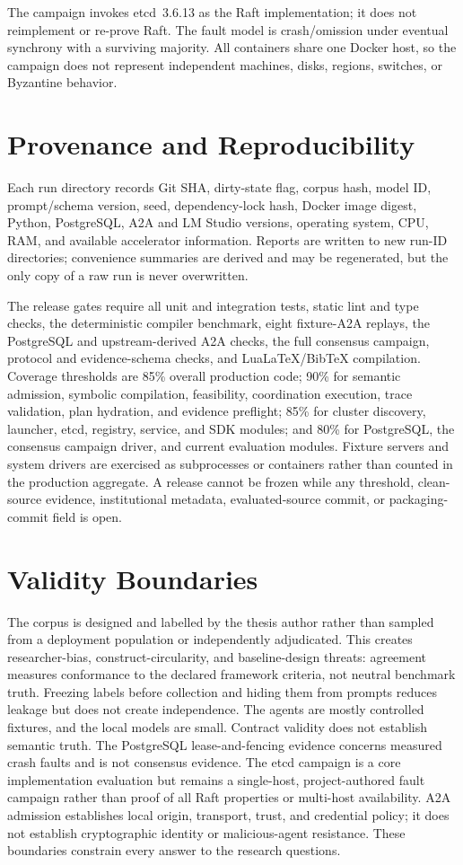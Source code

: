 The campaign invokes etcd~3.6.13 as the Raft implementation; it does not reimplement or re-prove Raft. The fault model is crash/omission under eventual synchrony with a surviving majority. All containers share one Docker host, so the campaign does not represent independent machines, disks, regions, switches, or Byzantine behavior.

\section{Provenance and Reproducibility}

Each run directory records Git SHA, dirty-state flag, corpus hash, model ID, prompt/schema version, seed, dependency-lock hash, Docker image digest, Python, PostgreSQL, A2A and LM Studio versions, operating system, CPU, RAM, and available accelerator information. Reports are written to new run-ID directories; convenience summaries are derived and may be regenerated, but the only copy of a raw run is never overwritten.

The release gates require all unit and integration tests, static lint and type checks, the deterministic compiler benchmark, eight fixture-A2A replays, the PostgreSQL and upstream-derived A2A checks, the full consensus campaign, protocol and evidence-schema checks, and LuaLaTeX/BibTeX compilation. Coverage thresholds are 85\% overall production code; 90\% for semantic admission, symbolic compilation, feasibility, coordination execution, trace validation, plan hydration, and evidence preflight; 85\% for cluster discovery, launcher, etcd, registry, service, and SDK modules; and 80\% for PostgreSQL, the consensus campaign driver, and current evaluation modules. Fixture servers and system drivers are exercised as subprocesses or containers rather than counted in the production aggregate. A release cannot be frozen while any threshold, clean-source evidence, institutional metadata, evaluated-source commit, or packaging-commit field is open.

\section{Validity Boundaries}

The corpus is designed and labelled by the thesis author rather than sampled from a deployment population or independently adjudicated. This creates researcher-bias, construct-circularity, and baseline-design threats: agreement measures conformance to the declared framework criteria, not neutral benchmark truth. Freezing labels before collection and hiding them from prompts reduces leakage but does not create independence. The agents are mostly controlled fixtures, and the local models are small. Contract validity does not establish semantic truth. The PostgreSQL lease-and-fencing evidence concerns measured crash faults and is not consensus evidence. The etcd campaign is a core implementation evaluation but remains a single-host, project-authored fault campaign rather than proof of all Raft properties or multi-host availability. A2A admission establishes local origin, transport, trust, and credential policy; it does not establish cryptographic identity or malicious-agent resistance. These boundaries constrain every answer to the research questions.
